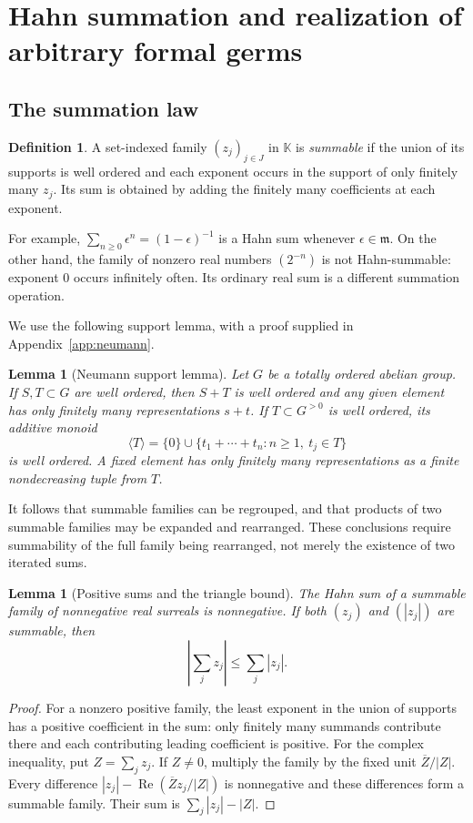 \documentclass[11pt,a4paper]{article}
\numberwithin{equation}{section}
\newtheorem{lemma}[theorem]{Lemma}
\theoremstyle{definition}
\newtheorem{definition}[theorem]{Definition}
\theoremstyle{remark}
\newcommand{\K}{\mathbb K}
\newcommand{\mm}{\mathfrak m}
\DeclareMathOperator{\Ree}{Re}
\begin{document}
\section{Hahn summation and realization of arbitrary formal germs}
\label{sec:sums}
\subsection{The summation law}
\begin{definition}
A set-indexed family $(z_j)_{j\in J}$ in $\K$ is \emph{summable} if the union of its supports is well ordered and each exponent occurs in the support of only finitely many $z_j$. Its sum is obtained by adding the finitely many coefficients at each exponent.
\end{definition}
For example, $\sum_{n\geq0}\epsilon^n=(1-\epsilon)^{-1}$ is a Hahn sum whenever $\epsilon\in\mm$. On the other hand, the family of nonzero real numbers $(2^{-n})$ is not Hahn-summable: exponent $0$ occurs infinitely often. Its ordinary real sum is a different summation operation.

We use the following support lemma, with a proof supplied in Appendix~\ref{app:neumann}.
\begin{lemma}[Neumann support lemma]
\label{lem:neumann}
Let $G$ be a totally ordered abelian group. If $S,T\subset G$ are well ordered, then $S+T$ is well ordered and any given element has only finitely many representations $s+t$. If $T\subset G^{>0}$ is well ordered, its additive monoid
\[
 \langle T\rangle=\{0\}\cup\{t_1+\cdots+t_n:n\geq1,\ t_j\in T\}
\]
is well ordered. A fixed element has only finitely many representations as a finite nondecreasing tuple from $T$.
\end{lemma}

It follows that summable families can be regrouped, and that products of two summable families may be expanded and rearranged. These conclusions require summability of the full family being rearranged, not merely the existence of two iterated sums.

\begin{lemma}[Positive sums and the triangle bound]
\label{lem:triangle}
The Hahn sum of a summable family of nonnegative real surreals is nonnegative. If both $(z_j)$ and $(|z_j|)$ are summable, then
\[
 \left|\sum_jz_j\right|\leq\sum_j|z_j|.
\]
\end{lemma}
\begin{proof}
For a nonzero positive family, the least exponent in the union of supports has a positive coefficient in the sum: only finitely many summands contribute there and each contributing leading coefficient is positive. For the complex inequality, put $Z=\sum_jz_j$. If $Z\ne0$, multiply the family by the fixed unit $\overline Z/|Z|$. Every difference $|z_j|-\Ree(\overline Zz_j/|Z|)$ is nonnegative and these differences form a summable family. Their sum is $\sum_j|z_j|-|Z|$.
\end{proof}
\end{document}
